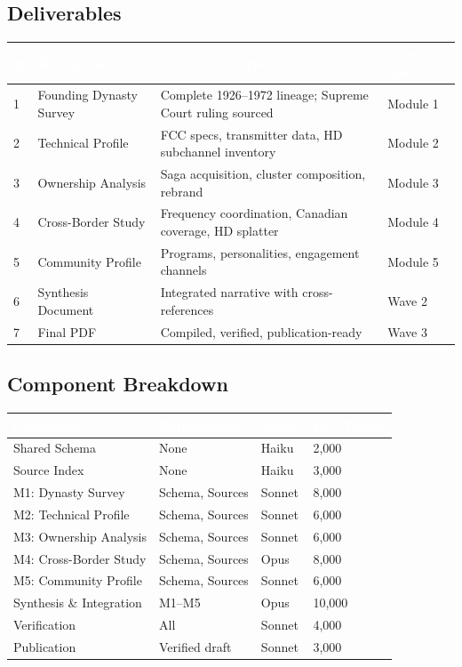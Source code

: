 \documentclass[11pt,letterpaper]{article}
\newcommand{\tableheader}[1]{\textbf{\sffamily\textcolor{white}{#1}}}
\begin{document}
\subsection{Deliverables}

\begin{center}
\begin{tabularx}{\textwidth}{C{0.6cm}L{3cm}XL{2.5cm}}
\toprule
{}
\tableheader{\#} & \tableheader{Deliverable} & \tableheader{Acceptance Criteria} & \tableheader{Source Spec} \\
 & Founding Dynasty Survey & Complete 1926--1972 lineage; Supreme Court ruling sourced & Module 1 \\
2 & Technical Profile & FCC specs, transmitter data, HD subchannel inventory & Module 2 \\
3 & Ownership Analysis & Saga acquisition, cluster composition, rebrand & Module 3 \\
4 & Cross-Border Study & Frequency coordination, Canadian coverage, HD splatter & Module 4 \\
5 & Community Profile & Programs, personalities, engagement channels & Module 5 \\
6 & Synthesis Document & Integrated narrative with cross-references & Wave 2 \\
7 & Final PDF & Compiled, verified, publication-ready & Wave 3 \\
\bottomrule
\end{tabularx}
\end{center}

\subsection{Component Breakdown}

\begin{center}
\begin{tabularx}{\textwidth}{L{3.5cm}L{2.5cm}C{1.5cm}C{2cm}}
\toprule
{}
\tableheader{Component} & \tableheader{Dependencies} & \tableheader{Model} & \tableheader{Est. Tokens} \\
\midrule
Shared Schema & None & Haiku & 2,000 \\
Source Index & None & Haiku & 3,000 \\
M1: Dynasty Survey & Schema, Sources & Sonnet & 8,000 \\
M2: Technical Profile & Schema, Sources & Sonnet & 6,000 \\
M3: Ownership Analysis & Schema, Sources & Sonnet & 6,000 \\
M4: Cross-Border Study & Schema, Sources & Opus & 8,000 \\
M5: Community Profile & Schema, Sources & Sonnet & 6,000 \\
Synthesis \& Integration & M1--M5 & Opus & 10,000 \\
Verification & All & Sonnet & 4,000 \\
Publication & Verified draft & Sonnet & 3,000 \\
\bottomrule
\end{tabularx}
\end{center}
\end{document}
